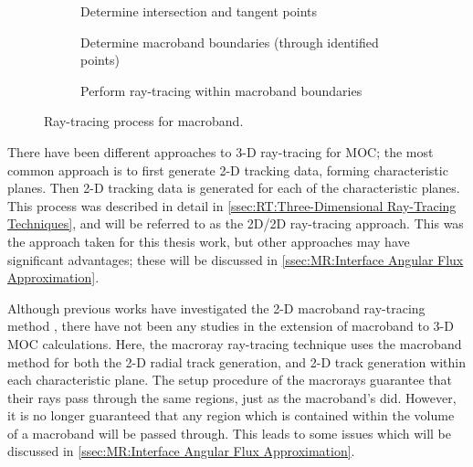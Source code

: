 {{{      \begin{figure}[ht]
        \centering
        \begin{subfigure}[t]{0.33\linewidth}
          \centering
          \def\svgwidth{0.95\linewidth}
          
          \caption{Determine intersection and tangent points}
        \end{subfigure}%
        \hfill
        \begin{subfigure}[t]{0.33\linewidth}
          \centering
          \def\svgwidth{0.95\linewidth}
          
          \caption{Determine macroband boundaries (through identified points)}
        \end{subfigure}%
        \hfill
        \begin{subfigure}[t]{0.33\linewidth}
          \centering
          \def\svgwidth{0.95\linewidth}
          
          \caption{Perform ray-tracing within macroband boundaries}
        \end{subfigure}
        \caption{Ray-tracing process for macroband.}
        \label{fig:MR:Macroband Process}
      \end{figure}
    }
    There have been different approaches to 3-D ray-tracing for \ac{MOC}; the most common approach is to first generate 2-D tracking data, forming characteristic planes.
    Then 2-D tracking data is generated for each of the characteristic planes.
    This process was described in detail in \cref{ssec:RT:Three-Dimensional Ray-Tracing Techniques}, and will be referred to as the 2D/2D ray-tracing approach.
    This was the approach taken for this thesis work, but other approaches may have significant advantages; these will be discussed in \cref{ssec:MR:Interface Angular Flux Approximation}.

    Although previous works have investigated the 2-D macroband ray-tracing method \cite{Yamamoto2005,Fevotte2007,Yamamoto2008}, there have not been any studies in the extension of macroband to 3-D \ac{MOC} calculations.
    Here, the macroray ray-tracing technique uses the macroband method for both the 2-D radial track generation, and 2-D track generation within each characteristic plane.
    The setup procedure of the macrorays guarantee that their rays pass through the same regions, just as the macroband's did.
    However, it is no longer guaranteed that any region which is contained within the volume of a macroband will be passed through.
    This leads to some issues which will be discussed in \cref{ssec:MR:Interface Angular Flux Approximation}.

}}
